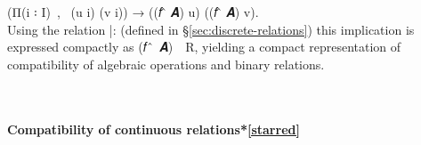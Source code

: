 (\af Π(\ab i \af ꞉ \ab I)~\af ,~ (\ab u \ab i) (\ab v \ab i)) \hskip2mm \as →  \hskip2mm  ((\ab 𝑓 \af ̂ \ab 𝑨) \ab u) ((\ab 𝑓 \af ̂ \ab 𝑨) \ab v).\\[4pt]
Using the relation |: (defined in \S\ref{sec:discrete-relations}) this implication is expressed compactly as (\ab 𝑓~\af ̂~\ab 𝑨)~\af{|:}~\ab R, yielding a compact representation of compatibility of algebraic operations and binary relations.
\ccpad
\begin{code}%
\>[0][@{}l@{\AgdaIndent{1}}]%
\>[1]\AgdaSpace{}%
\AgdaSymbol{:}\AgdaSpace{}%
\AgdaSymbol{(}\AgdaSpace{}%
\AgdaSymbol{:}\AgdaSpace{}%
\AgdaSpace{}%
\AgdaSpace{}%
\AgdaSymbol{)}\AgdaSpace{}%
\AgdaSpace{}%
\AgdaSpace{}%
\AgdaSpace{}%
\AgdaSpace{}%
\AgdaSpace{}%
\AgdaSpace{}%
\AgdaSpace{}%
\AgdaSpace{}%
\AgdaSpace{}%
\AgdaSpace{}%
\AgdaSpace{}%
\AgdaSpace{}%
\AgdaSpace{}%
\AgdaSpace{}%
\<%
\\
%
\>[1]%
\>[13]\AgdaSpace{}%
\AgdaSpace{}%
\AgdaSymbol{=}\AgdaSpace{}%
\AgdaSpace{}%
\AgdaSpace{}%
\AgdaSpace{}%
\AgdaSymbol{(}\AgdaSpace{}%
\AgdaSpace{}%
\AgdaSymbol{)}\AgdaSpace{}%
\AgdaFunction{|:}\AgdaSpace{}%
\<%
\end{code}

\paragraph*{Compatibility of continuous relations*\protect\cref{starred}}

